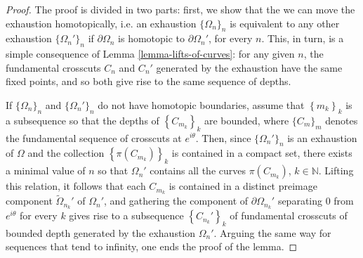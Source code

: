 \documentclass[11pt,a4paper,reqno]{amsart}
\theoremstyle{plain}
\theoremstyle{definition}
\theoremstyle{plain}
\renewcommand{\tilde}{\widetilde}
\begin{document}
\begin{proof}
The proof is divided in two parts: first, we show that the we can move the exhaustion homotopically, i.e. an exhaustion $\{\Omega_n\}_n$ is equivalent to any other exhaustion $\{\Omega_n'\}_n$ if $\partial\Omega_n$ is homotopic to $\partial\Omega_n'$, for every $n$. This, in turn, is a simple consequence of Lemma \ref{lemma-lifts-of-curves}: for any given $n$, the fundamental crosscuts $C_n$ and $C_n'$ generated by the exhaustion have the same fixed points, and so both give rise to the same sequence of depths.

If $\{\Omega_n\}_n$ and $\{\Omega_n'\}_n$ do not have homotopic boundaries, assume that $\left\lbrace m_k\right\rbrace _k$ is a subsequence so that the depths of $\left\lbrace C_{m_k}\right\rbrace _k$ are bounded, where $\{C_m\}_m$ denotes the fundamental sequence of crosscuts at $e^{i\theta}$. Then, since $\{\Omega_n'\}_n$ is an exhaustion of $\Omega$ and the collection $\left\lbrace \pi(C_{m_k})\right\rbrace _k$ is contained in a compact set, there exists a minimal value of $n$ so that $\Omega_n'$ contains all the curves $\pi(C_{m_k})$, $k\in\mathbb{N}$. Lifting this relation, it follows that each $C_{m_k}$ is contained in a distinct preimage component $\tilde\Omega_{n_k}'$ of $\Omega_n'$, and gathering the component of $\partial\Omega_{n_k}'$ separating $0$ from $e^{i\theta}$ for every $k$ gives rise to a subsequence $\left\lbrace C_{n_k}'\right\rbrace _k$ of fundamental crosscuts of bounded depth generated by the exhaustion $\Omega_n'$. Arguing the same way for sequences that tend to infinity, one ends the proof of the lemma.
\end{proof}
\end{document}
